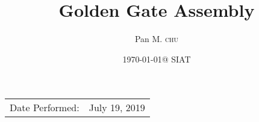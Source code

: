 \documentclass[a4paper, twocolumn]{article}
\title{Golden Gate Assembly} %
\author{Pan M. \textsc{chu}} %
\date{\today @ SIAT} %
\begin{document}
\maketitle %

\begin{center}
\begin{tabular}{l r}
Date Performed: & July 19, 2019 \\ %
\end{tabular}
\end{center}







 
\end{document}
